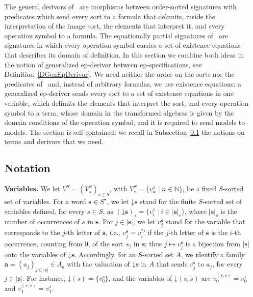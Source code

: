 \documentclass{amsart}
\newcommand{\bb}[1]{\ensuremath{\lvert #1 \rvert}}
\newcommand{\vs}[1]{\mathbin{\downarrow}#1}
\theoremstyle{plain}
\theoremstyle{definition}
\begin{document}
The general derivors of~\cite{LG18} are morphisms between order-sorted signatures with predicates which send every sort to a formula that delimits, inside the interpretation of the image sort, the elements that interpret it, and every operation symbol to a formula. The equationally partial signatures of~\cite{Rei87} are signatures in which every operation symbol carries a set of existence equations that describes its domain of definition. In this section we combine both ideas in the notion of generalized ep-derivor between ep-specifications, see Definition~\ref{DGenEpDerivor}. We need neither the order on the sorts nor the predicates of~\cite{LG18} and, instead of arbitrary formulas, we use existence equations: a generalized ep-derivor sends every sort to a set of existence equations in one variable, which delimits the elements that interpret the sort, and every operation symbol to a term, whose domain in the transformed algebras is given by the domain conditions of the operation symbol; and it is required to send models to models. The section is self-contained: we recall in Subsection~\ref{SGenEpNotation} the notions on terms and derivors that we need.

\subsection{Notation}\label{SGenEpNotation}

\textbf{Variables.} We let $V^{S}=(V^{S}_{s})_{s\in S}$, with $V^{S}_{s}=\{v^{s}_{n}\mid n\in\mathbb{N}\}$, be a fixed $S$-sorted set of variables. For a word $\mathbf{s}\in S^{\star}$, we let $\vs{\mathbf{s}}$ stand for the finite $S$-sorted set of variables defined, for every $s\in S$, as $(\vs{\mathbf{s}})_{s}=\{v^{s}_{i}\mid i\in\bb{\mathbf{s}}_{s}\}$, where $\bb{\mathbf{s}}_{s}$ is the number of occurrences of $s$ in $\mathbf{s}$. For $j\in\bb{\mathbf{s}}$, we let $v^{\mathbf{s}}_{j}$ stand for the variable that corresponds to the $j$-th letter of $\mathbf{s}$, i.e., $v^{\mathbf{s}}_{j}=v^{s_{j}}_{i}$ if the $j$-th letter of $\mathbf{s}$ is the $i$-th occurrence, counting from $0$, of the sort $s_{j}$ in $\mathbf{s}$; thus $j\mapsto v^{\mathbf{s}}_{j}$ is a bijection from $\bb{\mathbf{s}}$ onto the variables of $\vs{\mathbf{s}}$. Accordingly, for an $S$-sorted set $A$, we identify a family $\mathbf{a}=(a_{j})_{j\in\bb{\mathbf{s}}}\in A_{\mathbf{s}}$ with the valuation of $\vs{\mathbf{s}}$ in $A$ that sends $v^{\mathbf{s}}_{j}$ to $a_{j}$, for every $j\in\bb{\mathbf{s}}$. For instance, $\vs{(s)}=\{v^{s}_{0}\}$, and the variables of $\vs{(s,s)}$ are $v^{(s,s)}_{0}=v^{s}_{0}$ and $v^{(s,s)}_{1}=v^{s}_{1}$.
\end{document}
